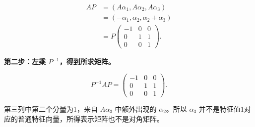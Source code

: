 \documentclass[UTF8,11pt,fontset=windows]{ctexart}
\begin{document}
$$
\begin{aligned}
AP&=(A\alpha_1,A\alpha_2,A\alpha_3)\\
&=(-\alpha_1,\alpha_2,\alpha_2+\alpha_3)\\
&=P\begin{pmatrix}-1&0&0\\0&1&1\\0&0&1\end{pmatrix}.
\end{aligned}
$$

\textbf{第二步：左乘 $P^{-1}$，得到所求矩阵。}

$$
\boxed{P^{-1}AP=\begin{pmatrix}-1&0&0\\0&1&1\\0&0&1\end{pmatrix}}.
$$

第三列中第二个分量为1，来自 $A\alpha_3$ 中额外出现的 $\alpha_2$。所以 $\alpha_3$ 并不是特征值1对应的普通特征向量，所得表示矩阵也不是对角矩阵。
\end{document}
